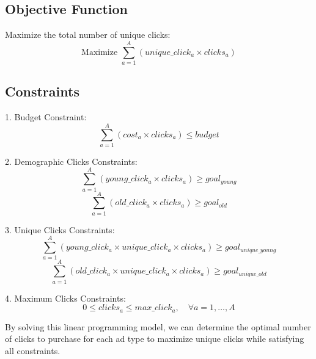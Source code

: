 \documentclass{article}
\begin{document}
\subsection*{Objective Function}

Maximize the total number of unique clicks:
\[
\text{Maximize } \sum_{a=1}^{A} (unique\_click_{a} \times clicks_{a})
\]

\subsection*{Constraints}

1. Budget Constraint:
   \[
   \sum_{a=1}^{A} (cost_{a} \times clicks_{a}) \leq budget
   \]

2. Demographic Clicks Constraints:
   \[
   \sum_{a=1}^{A} (young\_click_{a} \times clicks_{a}) \geq goal_{young}
   \]
   \[
   \sum_{a=1}^{A} (old\_click_{a} \times clicks_{a}) \geq goal_{old}
   \]

3. Unique Clicks Constraints:
   \[
   \sum_{a=1}^{A} \left(young\_click_{a} \times unique\_click_{a} \times clicks_{a} \right) \geq goal_{unique\_young}
   \]
   \[
   \sum_{a=1}^{A} \left(old\_click_{a} \times unique\_click_{a} \times clicks_{a} \right) \geq goal_{unique\_old}
   \]

4. Maximum Clicks Constraints:
   \[
   0 \leq clicks_{a} \leq max\_click_{a}, \quad \forall a = 1, \ldots, A
   \]

By solving this linear programming model, we can determine the optimal number of clicks to purchase for each ad type to maximize unique clicks while satisfying all constraints.
\end{document}
